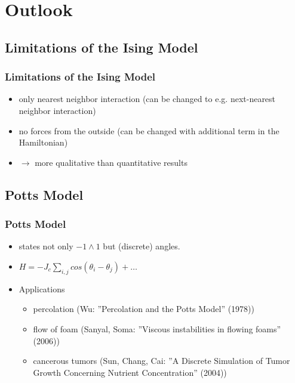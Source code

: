 \documentclass{beamer}
\begin{document}

\section{Outlook}\subsection{Limitations of the Ising Model}
\begin{frame}
\frametitle{Limitations of the Ising Model}
\begin{itemize}
\item only nearest neighbor interaction (can be changed to e.g. next-nearest neighbor interaction)
\item no forces from the outside (can be changed with additional term in the Hamiltonian)
\item $\rightarrow$ more qualitative than quantitative results
\end{itemize}
\end{frame}
\subsection{Potts Model}
\begin{frame}
\frametitle{Potts Model}
\begin{itemize}
\item states not only $-1 \land 1$ but (discrete) angles.
\item $H = -J_c \sum_{i,j}cos\left(\theta_i -\theta_j\right) +  \ldots$
\item Applications
\begin{itemize}
\item
percolation (Wu: ''Percolation and the Potts Model'' (1978))
\item 
flow of foam (Sanyal, Soma: ''Viscous instabilities in flowing foams'' (2006))
\item 
cancerous tumors (Sun, Chang, Cai: ''A Discrete Simulation of Tumor Growth Concerning Nutrient Concentration'' (2004))
\end{itemize}
\end{itemize}
\end{frame}

\section{}
\end{document}
